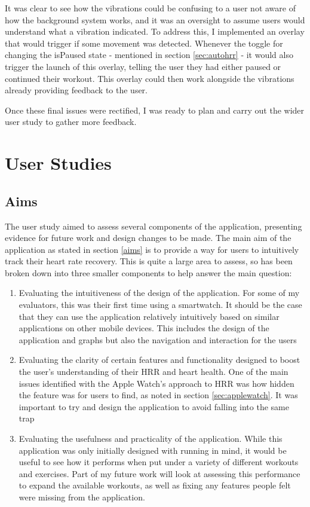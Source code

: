 \documentclass{l4proj}
\begin{document}
It was clear to see how the vibrations could be confusing to a user not aware of how the background system works, and it was an oversight to assume users would understand what a vibration indicated. To address this, I implemented an overlay that would trigger if some movement was detected. Whenever the toggle for changing the isPaused state - mentioned in section \ref{sec:autohrr} - it would also trigger the launch of this overlay, telling the user they had either paused or continued their workout. This overlay could then work alongside the vibrations already providing feedback to the user.

Once these final issues were rectified, I was ready to plan and carry out the wider user study to gather more feedback.

\section{User Studies}
\label{sec:userstudies}

\subsection{Aims}
\label{sec:userstudyaims}

The user study aimed to assess several components of the application, presenting evidence for future work and design changes to be made. The main aim of the application as stated in section \ref{aims} is to provide a way for users to intuitively track their heart rate recovery. This is quite a large area to assess, so has been broken down into three smaller components to help answer the main question:

\begin{enumerate}
    \item Evaluating the intuitiveness of the design of the application. For some of my evaluators, this was their first time using a smartwatch. It should be the case that they can use the application relatively intuitively based on similar applications on other mobile devices. This includes the design of the application and graphs but also the navigation and interaction for the users
    \item Evaluating the clarity of certain features and functionality designed to boost the user's understanding of their HRR and heart health. One of the main issues identified with the Apple Watch’s approach to HRR was how hidden the feature was for users to find, as noted in section \ref{sec:applewatch}. It was important to try and design the application to avoid falling into the same trap
    \item Evaluating the usefulness and practicality of the application. While this application was only initially designed with running in mind, it would be useful to see how it performs when put under a variety of different workouts and exercises. Part of my future work will look at assessing this performance to expand the available workouts, as well as fixing any features people felt were missing from the application.
\end{enumerate}
\end{document}

